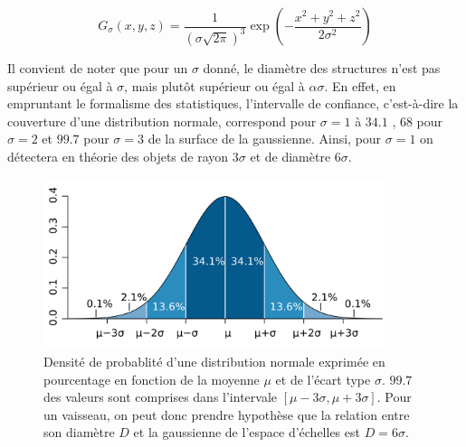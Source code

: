 \begin{equation}
  G_\sigma(x,y,z) = \frac{1}{ (\sigma\sqrt{2\pi})^3 }\exp(-\frac{x^2 + y^2 + z^2}{2\sigma^2 })
  \label{eq:Gaussienne 3D}
\end{equation}

Il convient de noter que pour un $\sigma$ donné, le diamètre des structures n'est pas supérieur ou égal à $\sigma$, mais plutôt supérieur ou égal à $\alpha\sigma$. En effet, en empruntant le formalisme des statistiques, l'intervalle de confiance, c'est-à-dire la couverture d'une distribution normale, correspond pour $\sigma=1$ à $34.1$ \percent{}, $68$ \percent{}pour $\sigma=2$ et $99.7$ \percent{}pour $\sigma=3$ de la surface de la gaussienne. Ainsi, pour $\sigma=1$ on détectera en théorie des objets de rayon $3\sigma$ et de diamètre $6\sigma$.  

\begin{figure}[!ht]
  \centering
  \includegraphics[height=5cm]{Images/normal_distribution_probability_coverage.png}
  \caption{Densité de probablité d'une distribution normale exprimée en pourcentage en fonction de la moyenne $\mu$ et de l'écart type $\sigma$. $99.7$ \percent{}des valeurs sont comprises dans l'intervale $[\mu-3\sigma,\mu+3\sigma]$. Pour un vaisseau, on peut donc prendre hypothèse que la relation entre son diamètre $D$ et la gaussienne de l'espace d'échelles est $D=6\sigma$.\protect\footnotemark}
  \label{fig:normal_distribution_probability_coverage}
\end{figure}


